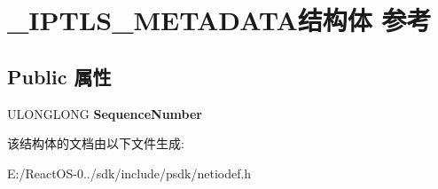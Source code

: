 \hypertarget{struct___i_p_t_l_s___m_e_t_a_d_a_t_a}{}\section{\+\_\+\+I\+P\+T\+L\+S\+\_\+\+M\+E\+T\+A\+D\+A\+T\+A结构体 参考}
\label{struct___i_p_t_l_s___m_e_t_a_d_a_t_a}
\subsection*{Public 属性}
\begin{DoxyCompactItemize}
\item 
\mbox{\label{struct___i_p_t_l_s___m_e_t_a_d_a_t_a_a0050e8b624ac52e08db8a5288dd5591e}} 
U\+L\+O\+N\+G\+L\+O\+NG {\bfseries Sequence\+Number}
\end{DoxyCompactItemize}


该结构体的文档由以下文件生成\+:\begin{DoxyCompactItemize}
\item 
E\+:/\+React\+O\+S-\/0../sdk/include/psdk/netiodef.\+h\end{DoxyCompactItemize}
